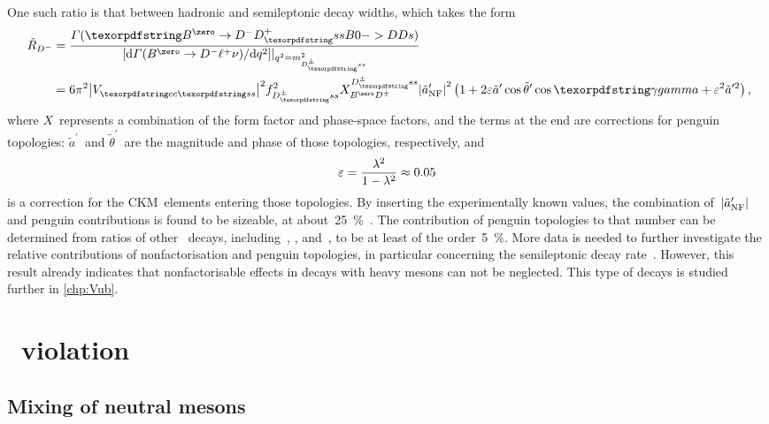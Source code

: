 One such ratio is that between hadronic and semileptonic decay widths, which takes the form~\cite{Bel:2015wha}
%
\begin{align}
    \tilde{R}_{\Dm} &= \dfrac{\Gamma(\BdDDs)}{[\deriv\Gamma(\BdDlnu)/\deriv q^{2}]|_{q^{2}=m_{\Dspm}^{2}}} \\
                 &= 6 \pi^{2} \abs{\Vcs}^{2} f_{\Dspm}^{2} X_{\Bd\Dpm}^{\Dspm} \abs{\aNFt^{\prime}}^{2} \left(1 + 2 \varepsilon \tilde{a}^{\prime} \cos \tilde{\theta}^{\prime} \cos{\CPgamma} + \varepsilon^{2} \tilde{a}^{\prime 2}\right) \rlap{,}
\end{align}
%
where \(X\)~represents a combination of the form factor and phase-space factors, and the terms at the end are corrections for penguin topologies: \(\tilde{a}^{\prime}\)~and \(\tilde{\theta}^{\prime}\)~are the magnitude and phase of those topologies, respectively, and
%
\begin{equation*}
    {\varepsilon = \frac{\wolfl^{2}}{1 - \wolfl^{2}} \approx \num{0.05}}
\end{equation*}
%
is a correction for the CKM~elements entering those topologies.
By inserting the experimentally known values, the combination of~\({\left|\tilde{a}_{\text{NF}}^{\prime}\right|}\) and penguin contributions is found to be sizeable, at about~\SI{25}{\percent}~\cite{Bel:2015wha}.
The contribution of penguin topologies to that number can be determined from ratios of other \BDD~decays, including~\BsDsDs, \BsDD, and~\BdDDs, to be at least of the order~\SI{5}{\percent}.
More data is needed to further investigate the relative contributions of nonfactorisation and penguin topologies, in particular concerning the semileptonic decay rate~\BsDslnu.
However, this result already indicates that nonfactorisable effects in decays with heavy mesons can not be neglected.
This type of decays is studied further in \cref{chp:Vub}.

\clearpage
\section{\CP~violation}
\label{sec:theory_CPV}

\subsection{Mixing of neutral mesons}
\label{sec:theory_Mixing}

